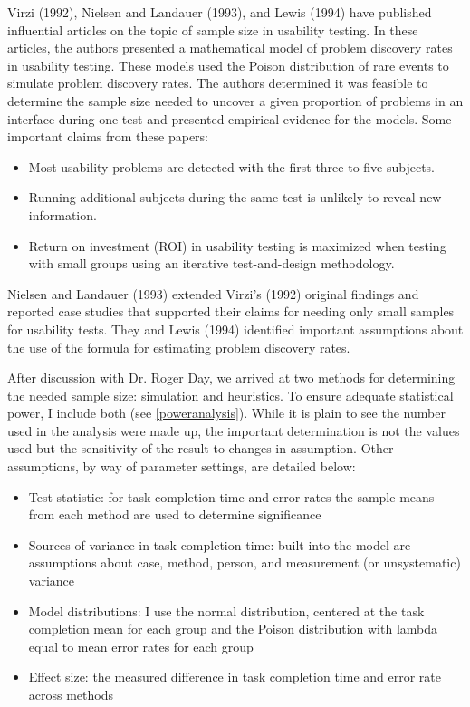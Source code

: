 \documentclass[11pt]{article}
\begin{document}
Virzi (1992), Nielsen and Landauer (1993), and Lewis (1994) have published influential articles on the topic of sample size in usability testing. In these articles, the authors presented a mathematical model of problem discovery rates in usability testing. These models used the Poison distribution of rare events to simulate problem discovery rates. The authors determined it was feasible to determine the sample size needed to uncover a given proportion of problems in an interface during one test and presented empirical evidence for the models. Some important claims from these papers:
\begin{itemize}
\item{Most usability problems are detected with the first three to five subjects.}
\item{Running additional subjects during the same test is unlikely to reveal new information.}
\item{Return on investment (ROI) in usability testing is maximized when testing with small groups using an iterative test-and-design methodology.}
\end{itemize}
Nielsen and Landauer (1993) extended Virzi’s (1992) original findings and reported case studies that supported their claims for needing only small samples for usability tests. They and Lewis (1994) identified important assumptions about the use of the formula for estimating problem discovery rates.

After discussion with Dr. Roger Day, we arrived at two methods for determining the needed sample size: simulation and heuristics. To ensure adequate statistical power, I include both (see \ref{poweranalysis}). While it is plain to see the number used in the analysis were made up, the important determination is not the values used but the sensitivity of the result to changes in assumption. Other assumptions, by way of parameter settings, are detailed below:

\begin{itemize}
\item{Test statistic: for task completion time and error rates the sample means from each method are used to determine significance}
\item{Sources of variance in task completion time: built into the model are assumptions about case, method, person, and measurement (or unsystematic) variance}
\item{Model distributions: I use the normal distribution, centered at the task completion mean for each group and the Poison distribution with lambda equal to mean error rates for each group}
\item{Effect size: the measured difference in task completion time and error rate across methods}
\end{itemize}
\end{document}

